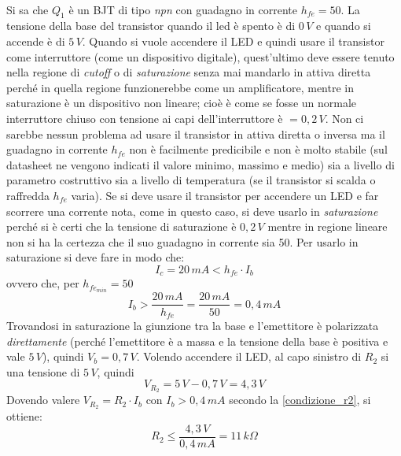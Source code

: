 \documentclass[12pt, a4paper]{report}
\begin{document}
\begin{appendices}
\begin{enumerate}
\begin{figure}[h]
    \end{figure}
    \\Si sa che $Q_1$ è un BJT di tipo \textit{npn} con guadagno in corrente $h_{fe} = 50$. La tensione della base del transistor quando il led è spento è di $0\,V$ e quando si accende è di $5\,V$. Quando si vuole accendere il LED e quindi usare il transistor come interruttore (come un dispositivo digitale), quest'ultimo deve essere tenuto nella regione di \textit{cutoff} o di \textit{saturazione} senza mai mandarlo in attiva diretta perché in quella regione funzionerebbe come un amplificatore, mentre in saturazione è un dispositivo non lineare; cioè è come se fosse un normale interruttore chiuso con tensione ai capi dell'interruttore è $=0,2\,V$. Non ci sarebbe nessun problema ad usare il transistor in attiva diretta o inversa ma il guadagno in corrente $h_{fe}$ non è facilmente predicibile e non è molto stabile (sul datasheet ne vengono indicati il valore minimo, massimo e medio) sia a livello di parametro costruttivo sia a livello di temperatura (se il transistor si scalda o raffredda $h_{fe}$ varia). Se si deve usare il transistor per accendere un LED e far scorrere una corrente nota, come in questo caso, si deve usarlo in \textit{saturazione} perché si è certi che la tensione di saturazione è $0,2\,V$ mentre in regione lineare non si ha la certezza che il suo guadagno in corrente sia 50. Per usarlo in saturazione si deve fare in modo che:
    \begin{equation*}
        I_{c} = 20\,mA < h_{fe} \cdot I_{b}
    \end{equation*}
    ovvero che, per $h_{fe_{min}} = 50$
    \begin{equation}
        I_{b} > \frac{20\,mA}{h_{fe}} = \frac{20\,mA}{50} = 0,4\,mA
        \label{condizione_r2}
    \end{equation}
    Trovandosi in saturazione la giunzione tra la base e l'emettitore è polarizzata \textit{direttamente} (perché l'emettitore è a massa e la tensione della base è positiva e vale $5\,V$), quindi $V_{b} = 0,7\,V$. Volendo accendere il LED, al capo sinistro di $R_2$ si una tensione di $5\,V$, quindi
    \begin{equation*}
        V_{R_2} = 5\,V - 0,7\,V = 4,3\,V
    \end{equation*}
    Dovendo valere $V_{R_2} = R_{2} \cdot I_{b}$ con $I_{b} > 0,4\,mA$ secondo la \eqref{condizione_r2}, si ottiene:
    \begin{equation*}
        R_{2} \leq \frac{4,3\,V}{0,4\,mA} = 11\,k\Omega
    \end{equation*}

\end{enumerate}
\end{appendices}
\end{document}
